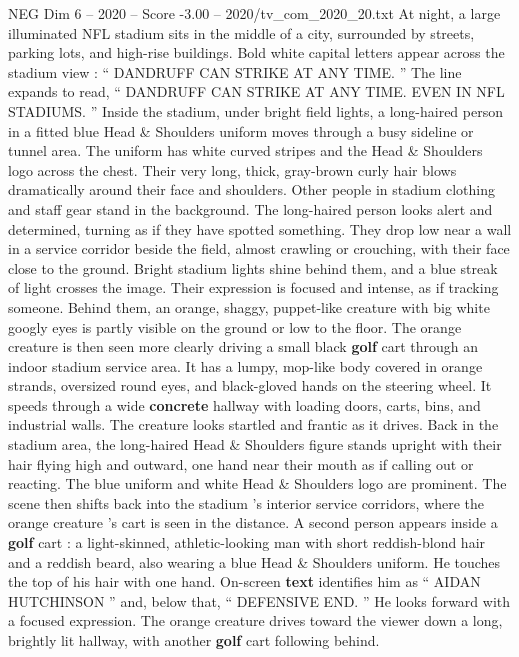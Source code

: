 \begin{textsample}{NEG Dim 6 – 2020 – Score -3.00 – 2020/tv\_com\_2020\_20.txt}  \label{ex:f6_neg_034}
At night, a large illuminated NFL stadium sits in the middle of a city, surrounded by streets, parking lots, and high-rise buildings.
Bold white capital letters appear across the stadium view : “ DANDRUFF CAN STRIKE AT ANY TIME. ” The line expands to read, “ DANDRUFF CAN STRIKE AT ANY TIME.
EVEN IN NFL STADIUMS. ” Inside the stadium, under bright field lights, a long-haired person in a fitted blue Head \& Shoulders uniform moves through a busy sideline or tunnel area.
The uniform has white curved stripes and the Head \& Shoulders logo across the chest.
Their very long, thick, gray-brown curly hair blows dramatically around their face and shoulders.
Other people in stadium clothing and staff gear stand in the background.
The long-haired person looks alert and determined, turning as if they have spotted something.
They drop low near a wall in a service corridor beside the field, almost crawling or crouching, with their face close to the ground.
Bright stadium lights shine behind them, and a blue streak of light crosses the image.
Their expression is focused and intense, as if tracking someone.
Behind them, an orange, shaggy, puppet-like creature with big white googly eyes is partly visible on the ground or low to the floor.
The orange creature is then seen more clearly driving a small black \textbf{golf} cart through an indoor stadium service area.
It has a lumpy, mop-like body covered in orange strands, oversized round eyes, and black-gloved hands on the steering wheel.
It speeds through a wide \textbf{concrete} hallway with loading doors, carts, bins, and industrial walls.
The creature looks startled and frantic as it drives.
Back in the stadium area, the long-haired Head \& Shoulders figure stands upright with their hair flying high and outward, one hand near their mouth as if calling out or reacting.
The blue uniform and white Head \& Shoulders logo are prominent.
The scene then shifts back into the stadium ’s interior service corridors, where the orange creature ’s cart is seen in the distance.
A second person appears inside a \textbf{golf} cart : a light-skinned, athletic-looking man with short reddish-blond hair and a reddish beard, also wearing a blue Head \& Shoulders uniform.
He touches the top of his hair with one hand.
On-screen \textbf{text} identifies him as “ AIDAN HUTCHINSON ” and, below that, “ DEFENSIVE END. ” He looks forward with a focused expression.
The orange creature drives toward the viewer down a long, brightly lit hallway, with another \textbf{golf} cart following behind.

\end{textsample}

